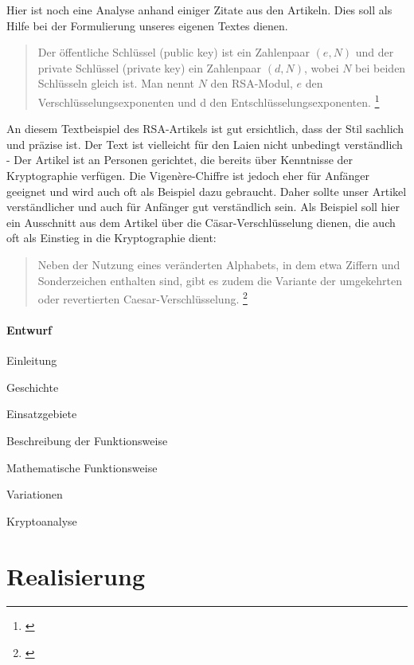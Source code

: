 \documentclass[11pt,paper=a4,final]{scrartcl}
\begin{document}
Hier ist noch eine Analyse anhand einiger Zitate aus den Artikeln. Dies soll als
Hilfe bei der Formulierung unseres eigenen Textes dienen.

\begin{quote}
  \frqq Der öffentliche Schlüssel (public key) ist ein Zahlenpaar \((e,N)\) und
  der private Schlüssel (private key) ein Zahlenpaar \((d,N)\), wobei \(N\) bei
  beiden Schlüsseln gleich ist. Man nennt \(N\) den RSA-Modul, \(e\) den
  Verschlüsselungsexponenten und d den Entschlüsselungsexponenten.\flqq
  \footnote{\cite{wiki:Caesar-Verschluesselung}}
\end{quote}

An diesem Textbeispiel des RSA-Artikels ist gut ersichtlich, dass der Stil
sachlich und pr\"azise ist. Der Text ist vielleicht f\"ur den Laien nicht
unbedingt verst\"andlich - Der Artikel ist an Personen gerichtet, die bereits
\"uber Kenntnisse der Kryptographie verf\"ugen. Die Vigen\`ere-Chiffre ist
jedoch eher f\"ur Anf\"anger geeignet und wird auch oft als Beispiel dazu
gebraucht. Daher sollte unser Artikel verst\"andlicher und auch f\"ur Anf\"anger
gut verst\"andlich sein. Als Beispiel soll hier ein Ausschnitt aus dem Artikel
\"uber die C\"asar-Verschl\"usselung dienen, die auch oft als Einstieg in die
Kryptographie dient:

\begin{quote}
  \frqq Neben der Nutzung eines veränderten Alphabets, in dem etwa Ziffern und
  Sonderzeichen enthalten sind, gibt es zudem die Variante der umgekehrten oder
  revertierten Caesar-Verschlüsselung.\flqq
  \footnote{\cite{wiki:RSA-Kryptosystem}}
\end{quote}

\paragraph{Entwurf}
\begin{enumerate*}
  \item Einleitung
  \item Geschichte
  \item Einsatzgebiete
  \item Beschreibung der Funktionsweise
  \item Mathematische Funktionsweise
  \item Variationen
  \item Kryptoanalyse
\end{enumerate*}
\section{Realisierung}
\label{sec:realisierung}
\end{document}
